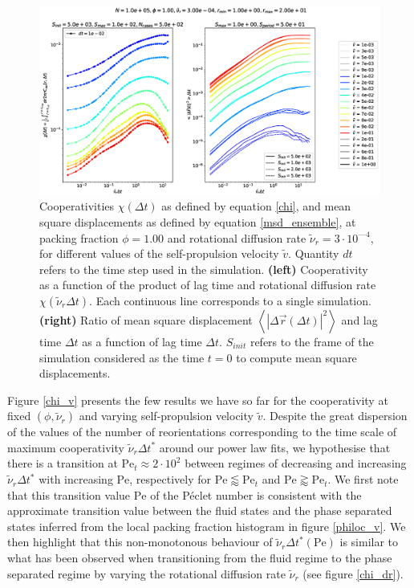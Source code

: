 \documentclass[class=report, float=false, crop=false]{standalone}
\begin{document}
\begin{figure}[h!]
\centering
\includegraphics[width=\textwidth]{figures/figs/intCuu_msdt_Dk8000_Rh3000_Nq1000_Io5000_Mn1000_Cn5000_RMINl1000_RMAXm2000.eps}
\caption{Cooperativities $\chi(\Delta t)$ as defined by equation \ref{chi}, and mean square displacements as defined by equation \ref{msd_ensemble}, at packing fraction $\phi = 1.00$ and rotational diffusion rate $\tilde{\nu}_r = 3\cdot10^{—4}$, for different values of the self-propulsion velocity $\tilde{v}$. Quantity $dt$ refers to the time step used in the simulation. \textbf{(left)} Cooperativity as a function of the product of lag time and rotational diffusion rate $\chi(\tilde{\nu}_r \Delta t)$. Each continuous line corresponds to a single simulation. \textbf{(right)} Ratio of mean square displacement $\left<|\Delta\vec{r}(\Delta t)|^2\right>$ and lag time $\Delta t$ as a function of lag time $\Delta t$. $S_{init}$ refers to the frame of the simulation considered as the time $t=0$ to compute mean square displacements.}
\label{chi_v_msd}
\end{figure}

Figure \ref{chi_v} presents the few results we have so far for the cooperativity at fixed $(\phi, \tilde{\nu}_r)$ and varying self-propulsion velocity $\tilde{v}$. Despite the great dispersion of the values of the number of reorientations corresponding to the time scale of maximum cooperativity $\tilde{\nu}_r \Delta t^*$ around our power law fits, we hypothesise that there is a transition at $\text{Pe}_t \approx 2\cdot10^2$ between regimes of decreasing and increasing $\tilde{\nu}_r \Delta t^*$ with increasing $\text{Pe}$, respectively for $\text{Pe} \lessapprox \text{Pe}_t$ and $\text{Pe} \gtrapprox \text{Pe}_t$. We first note that this transition value $\text{Pe}$ of the P\'eclet number is consistent with the approximate transition value between the fluid states and the phase separated states inferred from the local packing fraction histogram in figure \ref{philoc_v}. We then highlight that this non-monotonous behaviour of $\tilde{\nu}_r \Delta t^*(\text{Pe})$ is similar to what has been observed when transitioning from the fluid regime to the phase separated regime by varying the rotational diffusion rate $\tilde{\nu}_r$ (see figure \ref{chi_dr}).\\
\end{document}

